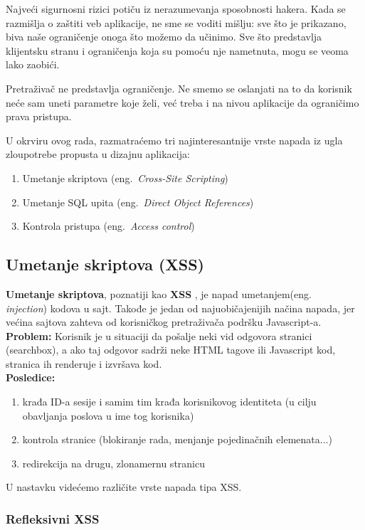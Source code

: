 \documentclass[a4paper]{article}
\begin{document}
Najveći sigurnosni rizici potiču iz nerazumevanja sposobnosti hakera. Kada se razmišlja o zaštiti veb aplikacije, ne sme se voditi mišlju: sve što je prikazano, biva naše ograničenje onoga što možemo da učinimo. Sve što predstavlja klijentsku stranu i ograničenja koja su pomoću nje nametnuta, mogu se veoma lako zaobići.

Pretraživač ne predstavlja ograničenje. Ne smemo se oslanjati na to da korisnik neće sam uneti parametre koje želi, već treba i na nivou aplikacije da ograničimo prava pristupa.

U okrviru ovog rada, razmatraćemo tri najinteresantnije vrste napada iz ugla zloupotrebe propusta u dizajnu aplikacija:
\begin{enumerate}
	\item Umetanje skriptova (eng.~{\em Cross-Site Scripting})
	\item Umetanje SQL upita (eng.~{\em Direct Object References})
	\item Kontrola pristupa (eng.~{\em Access control})
\end{enumerate}
\subsection{Umetanje skriptova (XSS)}
\textbf{Umetanje skriptova}, poznatiji kao \textbf{XSS} \cite{XSS}, je napad umetanjem(eng.~{\em \\injection}) kodova u sajt. Takođe je jedan od najuobičajenijih načina napada, jer većina sajtova zahteva od korisničkog pretraživača podršku Javascript-a.\\
\textbf{Problem:} Korisnik je u situaciji da pošalje neki vid odgovora stranici (searchbox), a ako taj odgovor sadrži neke HTML tagove ili Javascript kod, stranica ih renderuje i izvršava kod.\\
\textbf{Posledice:}
\begin{enumerate}
	\item krađa ID-a sesije i samim tim krađa korisnikovog identiteta (u cilju obavljanja poslova u ime tog korisnika)
	\item kontrola stranice (blokiranje rada, menjanje pojedinačnih elemenata...)
	\item redirekcija na drugu, zlonamernu stranicu
\end{enumerate}
U nastavku videćemo različite vrste napada tipa XSS.

\subsubsection{Refleksivni XSS}
\end{document}
